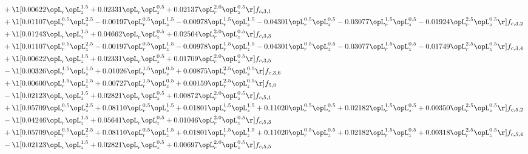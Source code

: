 \begin{alignat}{2}
& + \l[  0.00622 \opL_r \opL_z^{1.5} +  0.02331 \opL_r \opL_z^{0.5} +  0.02137 \opL_r^{2.0} \opL_z^{0.5}  \r] f_{c,3,1} \nonumber \\ 
& + \l[  0.01107 \opL_r^{0.5} \opL_z^{2.5}   -0.00197 \opL_r^{0.5} \opL_z^{1.5}   -0.00978 \opL_r^{1.5} \opL_z^{1.5}   -0.04301 \opL_r^{0.5} \opL_z^{0.5}   -0.03077 \opL_r^{1.5} \opL_z^{0.5}   -0.01924 \opL_r^{2.5} \opL_z^{0.5}  \r] f_{c,3,2} \nonumber \\ 
& + \l[  0.01243 \opL_r \opL_z^{1.5} +  0.04662 \opL_r \opL_z^{0.5} +  0.02564 \opL_r^{2.0} \opL_z^{0.5}  \r] f_{c,3,3} \nonumber \\ 
& + \l[  0.01107 \opL_r^{0.5} \opL_z^{2.5}   -0.00197 \opL_r^{0.5} \opL_z^{1.5}   -0.00978 \opL_r^{1.5} \opL_z^{1.5}   -0.04301 \opL_r^{0.5} \opL_z^{0.5}   -0.03077 \opL_r^{1.5} \opL_z^{0.5}   -0.01749 \opL_r^{2.5} \opL_z^{0.5}  \r] f_{c,3,4} \nonumber \\ 
& + \l[  0.00622 \opL_r \opL_z^{1.5} +  0.02331 \opL_r \opL_z^{0.5} +  0.01709 \opL_r^{2.0} \opL_z^{0.5}  \r] f_{c,3,5} \nonumber \\ 
& - \l[  0.00326 \opL_r^{1.5} \opL_z^{1.5} +  0.01026 \opL_r^{1.5} \opL_z^{0.5} +  0.00875 \opL_r^{2.5} \opL_z^{0.5}  \r] f_{c,3,6} \nonumber \\ 
& + \l[  0.00600 \opL_r^{1.5} \opL_z^{1.5} +  0.00727 \opL_r^{1.5} \opL_z^{0.5} +  0.00159 \opL_r^{2.5} \opL_z^{0.5}  \r] f_{5,0} \nonumber \\ 
& - \l[  0.02123 \opL_r \opL_z^{1.5} +  0.02821 \opL_r \opL_z^{0.5} +  0.00872 \opL_r^{2.0} \opL_z^{0.5}  \r] f_{c,5,1} \nonumber \\ 
& + \l[  0.05709 \opL_r^{0.5} \opL_z^{2.5} +  0.08110 \opL_r^{0.5} \opL_z^{1.5} +  0.01801 \opL_r^{1.5} \opL_z^{1.5} +  0.11020 \opL_r^{0.5} \opL_z^{0.5} +  0.02182 \opL_r^{1.5} \opL_z^{0.5} +  0.00350 \opL_r^{2.5} \opL_z^{0.5}  \r] f_{c,5,2} \nonumber \\ 
& - \l[  0.04246 \opL_r \opL_z^{1.5} +  0.05641 \opL_r \opL_z^{0.5} +  0.01046 \opL_r^{2.0} \opL_z^{0.5}  \r] f_{c,5,3} \nonumber \\ 
& + \l[  0.05709 \opL_r^{0.5} \opL_z^{2.5} +  0.08110 \opL_r^{0.5} \opL_z^{1.5} +  0.01801 \opL_r^{1.5} \opL_z^{1.5} +  0.11020 \opL_r^{0.5} \opL_z^{0.5} +  0.02182 \opL_r^{1.5} \opL_z^{0.5} +  0.00318 \opL_r^{2.5} \opL_z^{0.5}  \r] f_{c,5,4} \nonumber \\ 
& - \l[  0.02123 \opL_r \opL_z^{1.5} +  0.02821 \opL_r \opL_z^{0.5} +  0.00697 \opL_r^{2.0} \opL_z^{0.5}  \r] f_{c,5,5} \nonumber \\ 

\end{alignat}
